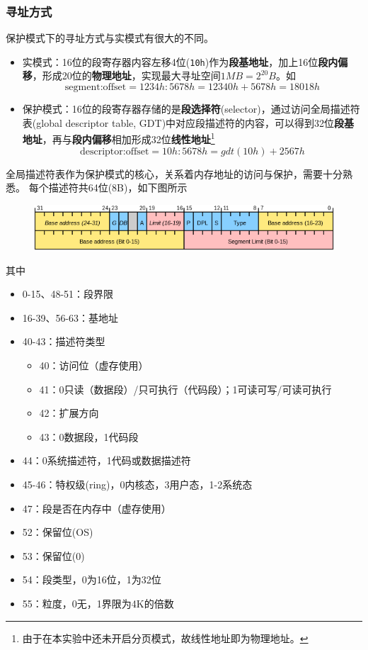 \documentclass[logo,reportComp]{thesis}
\begin{document}
\subsubsection{寻址方式}
\label{sub:gdt}
保护模式下的寻址方式与实模式有很大的不同。
\begin{itemize}
	\item 实模式：16位的段寄存器内容左移4位(\verb'10h')作为\textbf{段基地址}，加上16位\textbf{段内偏移}，形成20位的\textbf{物理地址}，实现最大寻址空间$1MB=2^{20}B$。如
	\[\text{segment:offset}=1234h:5678h=12340h+5678h=18018h\]
	\item 保护模式：16位的段寄存器存储的是\textbf{段选择符}(selector)，通过访问全局描述符表(global descriptor table, GDT)中对应段描述符的内容，可以得到32位\textbf{段基地址}，再与\textbf{段内偏移}相加形成32位\textbf{线性地址}\footnote{由于在本实验中还未开启分页模式，故线性地址即为物理地址。}
	\[\text{descriptor:offset}=10h:5678h=gdt(10h)+2567h\]
\end{itemize}

全局描述符表作为保护模式的核心，关系着内存地址的访问与保护，需要十分熟悉。
每个描述符共64位(8B)，如下图所示
\begin{figure}[H]
\centering
\includegraphics[width=0.8\linewidth]{fig/gdt.png}
\end{figure}

其中
\begin{itemize}
	\item 0-15、48-51：段界限
	\item 16-39、56-63：基地址
	\item 40-43：描述符类型
	\begin{itemize}
		\item 40：访问位（虚存使用）
		\item 41：0只读（数据段）/只可执行（代码段）；1可读可写/可读可执行
		\item 42：扩展方向
		\item 43：0数据段，1代码段
	\end{itemize}
	\item 44：0系统描述符，1代码或数据描述符
	\item 45-46：特权级(ring)，0内核态，3用户态，1-2系统态
	\item 47：段是否在内存中（虚存使用）
	\item 52：保留位(OS)
	\item 53：保留位(0)
	\item 54：段类型，0为16位，1为32位
	\item 55：粒度，0无，1界限为4K的倍数
\end{itemize}
\end{document}
